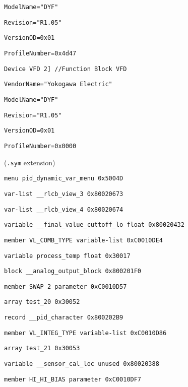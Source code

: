 {\tt ModelName="DYF"}

{\tt Revision="R1.05"}

{\tt VersionOD=0x01}

{\tt ProfileNumber=0x4d47}

\vskip 10pt

{\tt Device VFD 2] //Function Block VFD}

{\tt VendorName="Yokogawa Electric"}

{\tt ModelName="DYF"}

{\tt Revision="R1.05"}

{\tt VersionOD=0x01}

{\tt ProfileNumber=0x0000}

\vskip 10pt

\filbreak

\noindent
{} ({\tt .sym} extension)

\vskip 10pt

{\tt menu            pid\_dynamic\_var\_menu                      0x5004D }

{\tt var-list        \_\_rlcb\_view\_3                             0x80020673 }

{\tt var-list        \_\_rlcb\_view\_4                             0x80020674 }

{\tt variable        \_\_final\_value\_cuttoff\_lo  float           0x80020432 }

{\tt member          VL\_COMB\_TYPE              variable-list   0xC0010DE4 }

{\tt variable        process\_temp              float           0x30017 }

{\tt block           \_\_analog\_output\_block                     0x800201F0 }

{\tt member          SWAP\_2                    parameter       0xC0010D57 }

{\tt array           test\_20                                   0x30052 }

{\tt record          \_\_pid\_character                           0x800202B9 }

{\tt member          VL\_INTEG\_TYPE             variable-list   0xC0010D86 }

{\tt array           test\_21                                   0x30053 }

{\tt variable        \_\_sensor\_cal\_loc          unused          0x80020388 }

{\tt member          HI\_HI\_BIAS                parameter       0xC0010DF7 }

